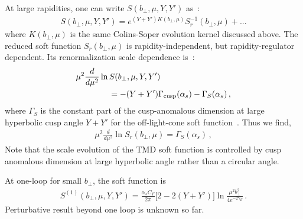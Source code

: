 \documentclass[twocolumn,aps,prd,preprintnumbers,superscriptaddress,10pt]{revtex4-1}
\begin{document}
At large rapidities, one can write $S(b_\perp,\mu,Y,Y')$ as~\cite{Collins:2011zzd}:
\begin{align}
S(b_\perp,\mu,Y,Y')=e^{(Y+Y')K(b_\perp,\mu)}S_r^{-1}(b_\perp,\mu) + ...
\end{align}
where $K(b_\perp,\mu)$ is the same Colins-Soper evolution kernel discussed above.
%
The reduced soft function $S_r(b_\perp,\mu)$ is rapidity-independent, but
rapidity-regulator dependent. Its renormalization scale dependence is~\cite{Ji:2019sxk}:
\begin{align}
&\mu^2 \frac{d}{d\mu^2} \ln S(b_\perp,\mu,Y,Y')\nonumber \\
&\qquad\qquad=-(Y+Y')\Gamma_{\rm cusp}(\alpha_s)-\Gamma_S(\alpha_s)\,,
\end{align}
where $\Gamma_S$ is the constant part of the cusp-anomalous dimension at large hyperbolic cusp angle $Y+Y'$ for the off-light-cone soft function~\cite{Collins:2011zzd}.
Thus we find,
\begin{align}
\mu^2 \frac{d}{d\mu^2} \ln S_r(b_\perp,\mu)=\Gamma_S(\alpha_s) \,,
\end{align}
Note that the scale evolution of the TMD soft function is controlled by cusp anomalous dimension at large hyperbolic angle rather than a circular angle.

At one-loop for small $b_\perp$, the soft function is~\cite{Ji:2004wu,Ebert:2019okf}
\begin{align}
S^{(1)}(b_\perp,\mu,Y,Y')=\frac{\alpha_sC_F}{2\pi}\big[2-2(Y+Y')\big]\ln\frac{\mu^2b_\perp^2}{4e^{-2\gamma_E}} \,.
\end{align}
Perturbative result beyond one loop is unknown so far.

\vspace{0.2cm}
\end{document}
